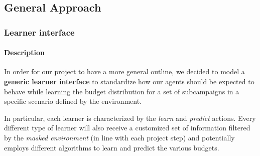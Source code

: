 
\subsection{General Approach}



\begin{frame}

\frametitle{Learner interface}
\framesubtitle{Description}

In order for our project to have a more general outline, we decided to model a \textbf{generic learner interface} to standardize how our agents should be expected to behave while learning the budget distribution for a set of subcampaigns in a specific scenario defined by the environment.

In particular, each learner is characterized by the \textit{learn} and \textit{predict} actions.
Every different type of learner will also receive a customized set of information filtered by the \textit{masked environment} (in line with each project step) and potentially employs different algorithms to learn and predict the various budgets.

\end{frame}



